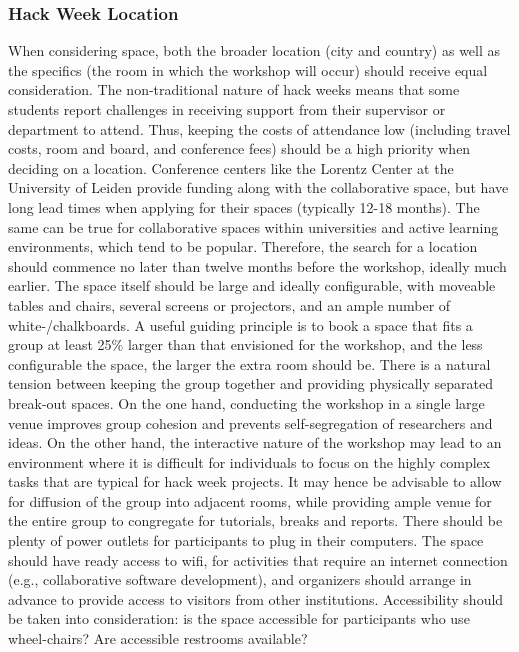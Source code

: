 \documentclass{aastex62}
\begin{document}
\subsubsection{Hack Week Location}
When considering space, both the broader location (city and country) as well as the specifics (the room in which the workshop will occur) should receive equal consideration. The non-traditional nature of hack weeks means that some students report challenges in receiving support from their supervisor or department to attend. Thus, keeping the costs of attendance low (including travel costs, room and board, and conference fees) should be a high priority when deciding on a location. Conference centers like the Lorentz Center at the University of Leiden provide funding along with the collaborative space, but have long lead times when applying for their spaces (typically 12-18 months). The same can be true for collaborative spaces within universities and active learning environments, which tend to be popular. Therefore, the search for a location should commence no later than twelve months before the workshop, ideally much earlier.
The space itself should be large and ideally configurable, with moveable tables and chairs, several screens or projectors, and an ample number of white-/chalkboards. A useful guiding principle is to book a space that fits a group at least 25\% larger than that envisioned for the workshop, and the less configurable the space, the larger the extra room should be.
There is a natural tension between keeping the group together and providing physically separated break-out spaces. On the one hand, conducting the workshop in a single large venue improves group cohesion and prevents self-segregation of researchers and ideas. On the other hand, the interactive nature of the workshop may lead to an environment where it is difficult for individuals to focus on the highly complex tasks that are typical for hack week projects. It may hence be advisable to allow for diffusion of the group into adjacent rooms, while providing ample venue for the entire group to congregate for tutorials, breaks and reports.
There should be plenty of power outlets for participants to plug in their computers.
The space should have ready access to wifi, for activities that require an internet connection (e.g., collaborative software development), and organizers should arrange in advance to provide access to visitors from other institutions.
Accessibility should be taken into consideration: is the space accessible for participants who use wheel-chairs? Are accessible restrooms available?
\end{document}
